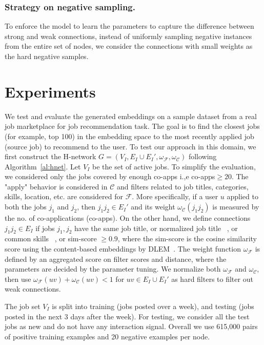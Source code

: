 \documentclass[manuscript,screen,review]{acmart}
\newcommand\Fcal{\mathcal{F}}
\newcommand{\Ccal}{\mathcal{C}}
\begin{document}
\subsubsection{Strategy on negative sampling.} 
To enforce the model to learn the parameters to capture the difference between strong and weak connections, instead of uniformly sampling negative instances from the entire set of nodes, we consider the connections with small weights as the hard negative samples. 

\section{Experiments} \label{Experiments}
We test and evaluate the generated embeddings on a sample dataset from a real job marketplace for job recommendation task. The goal is to find the closest jobs (for example, top 100) in the embedding space to the most recently applied job (source job) to recommend to the user.
To test our approach in this domain, we first construct the H-network $G=(V_I,E_I\cup E_I',\omega_{\mathcal{F}},\omega_{\mathcal{C}})$ following Algorithm~\ref{al:hnet}. Let $V_I$ be the set of active jobs. To simplify the evaluation, we considered only the jobs covered by enough co-apps i.,e co-apps$\geq20$.  The "apply" behavior is considered in $\Ccal$ and filters related to job titles, categories, skills, location, etc. are considered for $\Fcal$. More specifically, if a user $u$ applied to both the jobs $j_1$ and $j_2$, then $j_1j_2\in E_I'$ and its weight $\omega_{\Ccal}(j_1j_2)$ is measured by the no. of co-applications (co-apps). On the other hand, we define connections $j_1j_2\in E_I$ if jobs $j_1,j_2$ have the same job title, or normalized job title ~\cite{wang2019deepcarotene}, or common skills ~\cite{javed2017large}, or sim-score $\geq0.9$, where the sim-score is the cosine similarity score using the content-based embeddings by DLEM~\cite{zhao:2021embedding}. The weight function $\omega_{\Fcal}$ is defined by an aggregated score on filter scores and distance, where the parameters are decided by the parameter tuning.  We normalize both $\omega_{\Fcal}$ and $\omega_{\Ccal}$, then use $\omega_{\Fcal}(uv)+\omega_{\Ccal}(uv)<1$ for $uv\in E_I\cup E_I'$ as hard filters to filter out weak connections.

The job set $V_I$ is split into training (jobs posted over a week), and testing (jobs posted in the next 3 days after the week). For testing, we consider all the test jobs as new and do not have any interaction signal. Overall we use 615,000 pairs of positive training examples and 20 negative examples per node.
\end{document}
